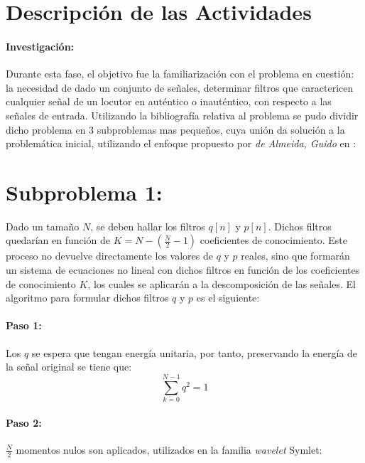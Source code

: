 \documentclass[11pt]{article}
\begin{document}
\clearpage

\section*{Descripción de las Actividades}
\paragraph*{Investigación:}
Durante esta fase, el objetivo fue la familiarización con el problema en cuestión: la necesidad de dado un conjunto de señales, determinar filtros que caractericen 
cualquier señal de un locutor en auténtico o inauténtico, con respecto a las señales de entrada. Utilizando la bibliografía relativa al problema se pudo dividir dicho problema en 
3 subproblemas mas pequeños, cuya unión da solución a la problemática inicial, utilizando el enfoque propuesto por {\it de Almeida, Guido} en \cite{ag2022} \cite{ag2021}:

\section*{Subproblema 1:}
Dado un tamaño \(N\), se deben hallar los filtros \(q[n]\) y \(p[n]\). Dichos filtros quedarían en función 
de \(K = N - (\frac{N}{2} - 1)\) coeficientes de conocimiento. Este proceso no devuelve directamente los valores de \(q\) y \(p\) reales, sino que formarán un sistema de 
ecuaciones no lineal con dichos filtros en función de los coeficientes de conocimiento \(K\), los cuales se aplicarán a la descomposición de las señales. El algoritmo 
para formular dichos filtros \(q\) y \(p\) es el siguiente:


\paragraph*{Paso 1:}
Los \(q\) se espera que tengan energía unitaria, por tanto, preservando la energía de la señal original se tiene que:
\begin{equation}
    \sum_{k=0}^{N - 1} q^2 = 1
\end{equation}

\paragraph*{Paso 2:}
\(\frac{N}{2}\) momentos nulos son aplicados, utilizados en la familia {\it wavelet} Symlet:
\end{document}
